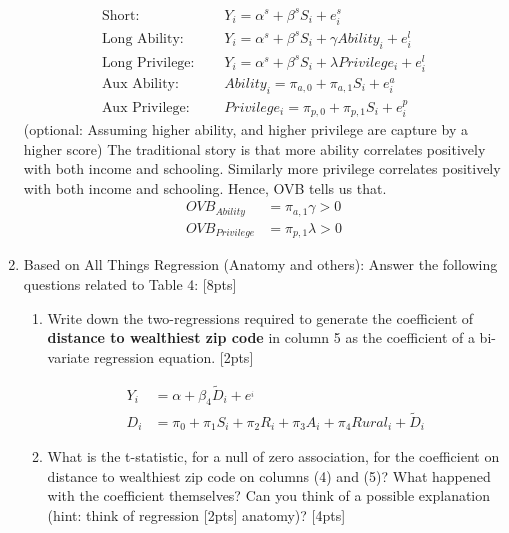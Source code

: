 \documentclass[answers]{exam}
\begin{document}
\begin{enumerate}
\begin{solution}
    \begin{align*}
    \text{Short: } &\quad Y_i = \alpha^{s} + \beta^{s} S_{i} +  e^{s}_{i}\\
    \text{Long Ability: }  &\quad Y_i = \alpha^{s} + \beta^{s} S_{i} + \gamma Ability_i +  e^{l}_{i}\\
    \text{Long Privilege: }  &\quad Y_i = \alpha^{s} + \beta^{s} S_{i} + \lambda Privilege_i + e^{l}_{i}\\
    \text{Aux Ability: }  &\quad Ability_i = \pi_{a,0} + \pi_{a,1} S_{i} + e^{a}_{i}\\
    \text{Aux Privilege: }  &\quad Privilege_i = \pi_{p,0} + \pi_{p,1} S_{i} + e^{p}_{i}
    \end{align*}
    (optional: Assuming higher ability, and higher privilege are capture by a higher score) The traditional story is that more ability correlates positively with both income and schooling. Similarly more privilege correlates positively with both income and schooling. Hence,  OVB tells us that. 
     \begin{align*}
    OVB_{Ability} &= \pi_{a,1} \gamma > 0\\
    OVB_{Privilege} &=   \pi_{p,1} \lambda > 0
    \end{align*}   
    \end{solution}

\item Based on All Things Regression (Anatomy and others): Answer the following questions related to Table 4: [8pts] 
\begin{enumerate}[label=\alph*)]
\item Write down the two-regressions required to generate the coefficient of \textbf{distance to wealthiest zip code} in column 5 as the coefficient of a bi-variate regression equation. [2pts]

\begin{solution}

    \begin{align*}
     Y_i &= \alpha + \beta_4 \widetilde D_{i} +  e^_{i}\\
     D_{i} &= \pi_0 + \pi_1 S_{i} + \pi_2 R_{i} + \pi_3 A_{i} + \pi_4 Rural_i + \widetilde D_{i} 
    \end{align*}

\end{solution}

\item What is the t-statistic, for a null of zero association, for the coefficient on distance to wealthiest zip code on columns (4) and (5)? What happened with the coefficient themselves?  Can you think of a possible explanation (hint: think of regression [2pts] anatomy)? [4pts]


\end{enumerate}
\end{enumerate}
\end{document}
